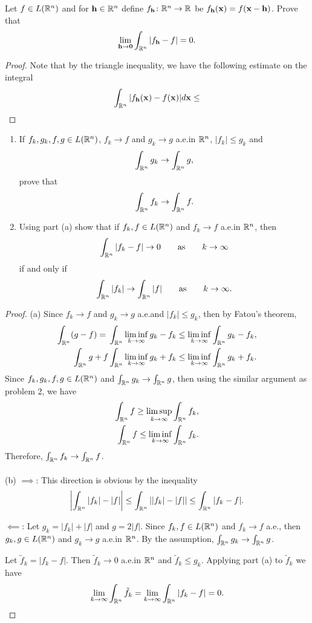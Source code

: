 \begin{problem}
Let $f\in L(\mathbb{R}^n)$ and for $\mathbf{h}\in\mathbb{R}^n$ define
$f_{\mathbf{h}}\colon\mathbb{R}^n\to\mathbb{R}$ be $f_{\mathbf{h}}(\mathbf{x})=
f(\mathbf{x}-\mathbf{h})$. Prove that
\[
\lim_{\mathbf{h}\to\mathbf{0}}\int_{\mathbb{R}^n}\left|f_{\mathbf{h}}-f\right|=0.
\]
\end{problem}
\begin{proof}
Note that by the triangle inequality, we have the following estimate on the
integral
\begin{equation}
\label{eq:minokwski-estimate-6}
\int_{\mathbb{R}^n}|f_{\mathbf{h}}(\mathbf{x})-f(\mathbf{x})| d \mathbf{x}\leq
\end{equation}

\end{proof}

\begin{problem}
\begin{enumerate}[label=(\alph*)]
\item If $f_k,g_k,f,g\in L(\mathbb{R}^n)$, $f_k\to f$ and $g_k\to g$ a.e.\@ in
  $\mathbb{R}^n$, $|f_k|\leq g_k$ and
\[
\int_{\mathbb{R}^n}g_k\to\int_{\mathbb{R}^n}g,
\]
prove that
\[
\int_{\mathbb{R}^n} f_k\to\int_{\mathbb{R}^n}f.
\]
\item Using part (a) show that if $f_k,f\in L(\mathbb{R}^n)$ and $f_k\to f$
  a.e.\@ in $\mathbb{R}^n$, then
\[
\int_{\mathbb{R}^n}|f_k-f|\to 0\qquad\text{as}\qquad k\to\infty
\]
if and only if
\[
\int_{\mathbb{R}^n}|f_k|\to\int_{\mathbb{R}^n}|f|\qquad\text{as}\qquad k\to\infty.
\]
\end{enumerate}
\end{problem}
\begin{proof}
(a) Since $f_k\to f$ and $g_k\to g$ a.e.\@ and $|f_k|\leq g_k$, then by
Fatou's theorem,
\begin{align*}
\int_{\mathbb{R}^n}(g-f)
={}&\int_{\mathbb{R}^n}\liminf_{k\to\infty} g_k-f_k
\leq\liminf_{k\to\infty}\int_{\mathbb{R}^n}g_k-f_k,\\
\int_{\mathbb{R}^n}g+f&\int_{\mathbb{R}^n}\liminf_{k\to\infty}g_k+f_k\leq\liminf_{k\to\infty}\int_{\mathbb{R}^n}g_k+f_k.
\end{align*}
Since $f_k,g_k,f,g\in L(\mathbb{R}^n)$ and $\int_{\mathbb{R}^n}g_k\to\int_{\mathbb{R}^n}g$,
then using the similar argument as problem 2, we have
\[
  \begin{aligned}
   \int_{\mathbb{R}^n}f\geq\limsup_{k\to\infty}\int_{\mathbb{R}^n}f_k,\\
   \int_{\mathbb{R}^n}f\leq\liminf_{k\to\infty}\int_{\mathbb{R}^n} f_k.
  \end{aligned}
\]
Therefore, $\int_{\mathbb{R}^n}f_k\to\int_{\mathbb{R}^n} f$.
\\\\
(b) $\implies$: This direction is obvious by the inequality
\[
\left|\int_{\mathbb{R}^n}|f_k|-|f|\right|\leq\int_{\mathbb{R}^n}\left||f_k|-|f|\right|\leq\int_{\mathbb{R}^n}|f_k-f|.
\]

$\impliedby$: Let $g_k= |f_k|+|f|$ and $g= 2|f|$. Since
$f_k,f\in L(\mathbb{R}^n)$ and $f_k\to f$ a.e., then $g_k,g\in L(\mathbb{R}^n)$ and
$g_k\to g$ a.e.\@ in $\mathbb{R}^n$. By the assumption, $\int_{\mathbb{R}^n}
g_k\to\int_{\mathbb{R}^n}g$.

Let $\tilde f_k=|f_k-f|$. Then $\tilde f_k\to 0$ a.e.\@ in $\mathbb{R}^n$
and $\tilde f_k\leq g_k$. Applying part (a) to $\tilde f_k$ we have
\[
\lim_{k\to\infty}\int_{\mathbb{R}^n}\tilde f_k=\lim_{k\to\infty}\int_{\mathbb{R}^n}|f_k-f|=0.
\]
\end{proof}
